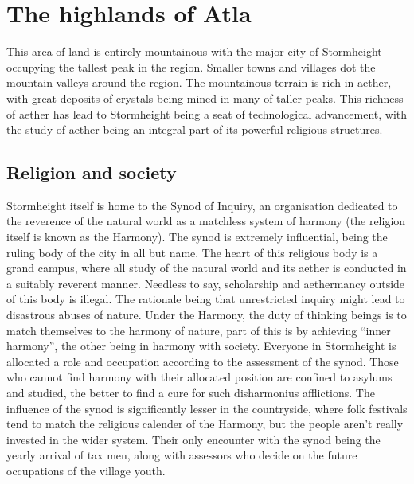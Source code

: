\documentclass[a4paper,11pt,oneside]{book}
\newcommand{\textlf}[1]{\textbf{\titlecap{#1}}}
\begin{document}
%



\chapter{The highlands of Atla}
This area of land is entirely mountainous with the major city of Stormheight occupying the tallest peak in the region. Smaller towns and villages dot the mountain valleys around the region. The mountainous terrain is rich in aether, with great deposits of crystals being mined in many of taller peaks. This richness of aether has lead to Stormheight being a seat of technological advancement, with the study of aether being an integral part of its powerful religious structures.  

\section{Religion and society}
Stormheight itself is home to the Synod of Inquiry, an organisation dedicated to the reverence of the natural world as a matchless system of harmony (the religion itself is known as the Harmony). The synod is extremely influential, being the ruling body of the city in all but name. The heart of this religious body is a grand campus, where all study of the natural world and its aether is conducted in a suitably reverent manner. Needless to say, scholarship and aethermancy outside of this body is illegal. The rationale being that unrestricted inquiry might lead to disastrous abuses of nature. Under the Harmony, the duty of thinking beings is to match themselves to the harmony of nature, part of this is by achieving ``inner harmony'', the other being in harmony with society. Everyone in Stormheight is allocated a role and occupation according to the assessment of the synod. Those who cannot find harmony with their allocated position are confined to asylums and studied, the better to find a cure for such disharmonius afflictions. The influence of the synod is significantly lesser in the countryside, where folk festivals tend to match the religious calender of the Harmony, but the people aren't really invested in the wider system. Their only encounter with the synod being the yearly arrival of tax men, along with assessors who decide on the future occupations of the village youth.
\end{document}
